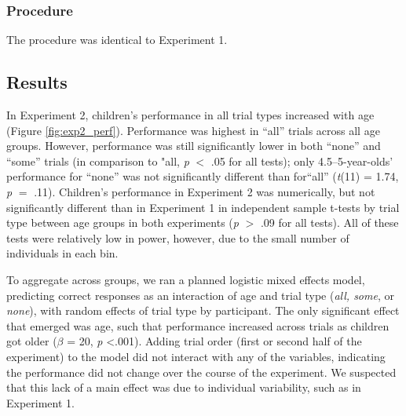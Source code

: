 \documentclass[man]{apa2}
\begin{document}
\subsubsection{Procedure}
The procedure was identical to Experiment 1.

\subsection{Results}

In Experiment 2, children's performance in all trial types increased with age (Figure \ref{fig:exp2_perf}). Performance was highest in ``all'' trials across all age groups. However, performance was still significantly lower in both ``none'' and ``some'' trials (in comparison to "all, \emph{p} $<$ .05 for all tests); only 4.5--5-year-olds' performance for ``none'' was not significantly different than for``all'' (\emph{t}(11) = 1.74, \emph{p} $=$ .11). Children's performance in Experiment 2 was numerically, but not significantly different than in Experiment 1 in independent sample t-tests by trial type between age groups in both experiments (\emph{p} $>$ .09 for all tests). All of these tests were relatively low in power, however, due to the small number of individuals in each bin.



To aggregate across groups, we ran a planned logistic mixed effects model, predicting correct responses as an interaction of age and trial type (\textit{all, some}, or \textit{none}), with random effects of trial type by participant. The only significant effect that emerged was age, such that performance increased across trials as children got older ($\beta$ = 20, \textit{p} \textless  .001). Adding trial order (first or second half of the experiment) to the model did not interact with any of the variables, indicating the performance did not change over the course of the experiment. We suspected that this lack of a main effect was due to individual variability, such as in Experiment 1.
\end{document}
